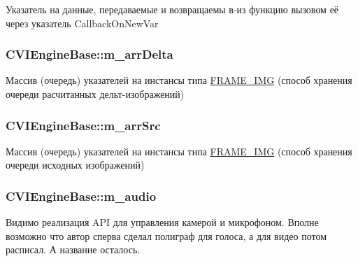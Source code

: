 Указатель на данные, передаваемые и возвращаемы в-\/из функцию вызовом её через указатель Callback\+On\+New\+Var 

\hypertarget{class_c_v_i_engine_base_abd1077e6704b0f6bbc788c4d3e7f150e}{
\subsubsection[{m\+\_\+arr\+Delta}]{ C\+V\+I\+Engine\+Base\+::m\+\_\+arr\+Delta}}\label{class_c_v_i_engine_base_abd1077e6704b0f6bbc788c4d3e7f150e}


Массив (очередь) указателей на инстансы типа \hyperlink{class_f_r_a_m_e___i_m_g}{F\+R\+A\+M\+E\+\_\+\+I\+M\+G} (способ хранения очереди расчитанных дельт-\/изображений) 

\hypertarget{class_c_v_i_engine_base_a9b14da4c2f0ccba53a81ab89b89b2a03}{
\subsubsection[{m\+\_\+arr\+Src}]{ C\+V\+I\+Engine\+Base\+::m\+\_\+arr\+Src}}\label{class_c_v_i_engine_base_a9b14da4c2f0ccba53a81ab89b89b2a03}


Массив (очередь) указателей на инстансы типа \hyperlink{class_f_r_a_m_e___i_m_g}{F\+R\+A\+M\+E\+\_\+\+I\+M\+G} (способ хранения очереди исходных изображений) 

\hypertarget{class_c_v_i_engine_base_af996670eec8597e3529bfd0a2ec2585e}{
\subsubsection[{m\+\_\+audio}]{ C\+V\+I\+Engine\+Base\+::m\+\_\+audio}}\label{class_c_v_i_engine_base_af996670eec8597e3529bfd0a2ec2585e}


Видимо реализация A\+P\+I для управления камерой и микрофоном. Вполне возможно что автор сперва сделал полиграф для голоса, а для видео потом расписал. А название осталось. 

